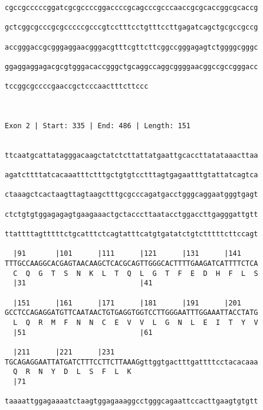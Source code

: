 \documentclass{article}
\begin{document}
\begin{Verbatim}
cgccgcccccggatcgcgccccggaccccgcagcccgcccaaccgcgcaccggcgcaccg
                                                            
gctcggcgcccgcgcccccgcccgtcctttcctgtttccttgagatcagctgcgccgccg
                                                            
accgggaccgcgggaggaacgggacgtttcgttcttcggccgggagagtctggggcgggc
                                                            
ggaggaggagacgcgtgggacaccgggctgcaggccaggcggggaacggccgccgggacc
                                                            
tccggcgccccgaaccgctcccaactttcttccc
                                  
                                  
 
Exon 2 | Start: 335 | End: 486 | Length: 151


ttcaatgcattatagggacaagctatctcttattatgaattgcaccttatataaacttaa
                                                            
agatcttttatcacaaatttctttgctgtgtcctttagtgagaatttgtattatcagtca
                                                            
ctaaagctcactaagttagtaagctttgcgcccagatgacctgggcaggaatgggtgagt
                                                            
ctctgtgtggagagagtgaagaaactgctacccttaatacctggaccttgagggattgtt
                                                            
ttattttagtttttctgcatttctcagtatttcatgtgatatctgtctttttcttccagt
                                                            
  |91       |101      |111      |121      |131      |141    
TTTGCCAAGGCACGAGTAACAAGCTCACGCAGTTGGGCACTTTTGAAGATCATTTTCTCA
  C  Q  G  T  S  N  K  L  T  Q  L  G  T  F  E  D  H  F  L  S
  |31                           |41                         
  
  |151      |161      |171      |181      |191      |201    
GCCTCCAGAGGATGTTCAATAACTGTGAGGTGGTCCTTGGGAATTTGGAAATTACCTATG
  L  Q  R  M  F  N  N  C  E  V  V  L  G  N  L  E  I  T  Y  V
  |51                           |61                         
  
  |211      |221      |231                                  
TGCAGAGGAATTATGATCTTTCCTTCTTAAAGgttggtgactttgattttcctacacaaa
  Q  R  N  Y  D  L  S  F  L  K                              
  |71                                                       
  
taaaattggagaaaatctaagtggagaaaggcctgggcagaattccacttgaagtgtgtt
                                                            

\end{Verbatim}
\end{document}
